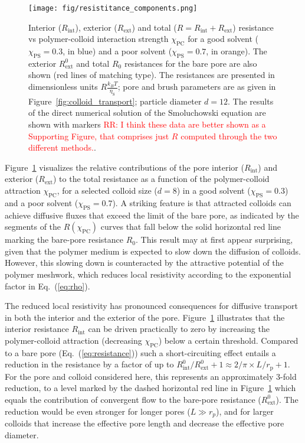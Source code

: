\documentclass[12pt, a4paper]{article}
\newcommand\todo[1]{\textcolor{red}{#1}}
\begin{document}
\begin{figure}
    \centering
    \texttt{[image: fig/resistitance\_components.png]}
    \caption{
    Interior ($R_{\text{int}}$), exterior ($R_{\text{ext}}$) and total ($R = R_{\text{int}} + R_{\text{ext}}$) resistance  vs polymer-colloid interaction strength $\chi_{\text{PC}}$ for a good solvent ($\chi_{\text{PS}} = 0.3$, in blue) and a poor solvent ($\chi_{\text{PS}} = 0.7$, in orange).
    The exterior $R_{\text{ext}}^{0}$ and total $R_0$ resistances for the bare pore are also shown (red lines of matching type).  
    The resistances are presented in dimensionless units $R\tfrac{k_{B}T}{\eta_{\text{S}}}$; pore and brush parameters are as given in Figure~\ref{fig:colloid_transport}; particle diameter $d = 12$.
    The results of the direct numerical solution of the Smoluchowski equation are shown with markers \todo{RR: I think these data are better shown as a Supporting Figure, that comprises just $R$ computed through the two different methods.}.
    }
    \label{fig:R_vs_chi_PC}
\end{figure}

Figure~\ref{fig:R_vs_chi_PC} visualizes the relative contributions of the pore interior ($R_{\text{int}}$) and exterior ($R_{\text{ext}}$) to the total resistance as a function of the polymer-colloid attraction $\chi_\text{PC}$,
for a selected colloid size ($d = 8$) in a good solvent ($\chi_\text{PS} = 0.3$) and a poor solvent ($\chi_\text{PS} = 0.7$).
A striking feature is that attracted colloids can achieve diffusive fluxes that exceed the limit of the bare pore, as indicated by the segments of the $R(\chi_{\text{PC}})$ curves that fall below the solid horizontal red line marking the bare-pore resistance $R_{0}$.
This result may at first appear surprising, given that the polymer medium is expected to slow down the diffusion of colloids.
However, this slowing down is counteracted by the attractive potential of the polymer meshwork, which reduces local resistivity according to the exponential factor in Eq.~(\ref{eq:rho}).

The reduced local resistivity has pronounced consequences for diffusive transport in both the interior and the exterior of the pore.
Figure~\ref{fig:R_vs_chi_PC} illustrates that the interior resistance $R_{\text{int}}$ can be driven practically to zero by increasing the polymer-colloid attraction (decreasing $\chi_\text{PC}$) below a certain threshold.
Compared to a bare pore (Eq.~(\ref{eq:resistance})) such a short-circuiting effect entails a reduction in the resistance by a factor of up to $R^0_{\text{int}}/R^0_{\text{ext}}+1 \approx 2/\pi \times L / r_{\text{p}} + 1$.
For the pore and colloid considered here, this represents an approximately 3-fold reduction, to a level marked by the dashed horizontal red line in Figure~\ref{fig:R_vs_chi_PC} which equals the contribution of convergent flow to the bare-pore resistance ($R^0_\text{ext}$).
The reduction would be even stronger for longer pores ($L\gg r_p$), and for larger colloids that increase the effective pore length and decrease the effective pore diameter.
\end{document}
